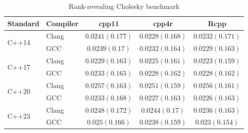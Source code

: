 \begin{table}[H]
\centering
\begingroup\renewcommand{\arraystretch}{1.2}
\begin{tabular}{|l|l|c|c|c|}
\hline
Standard & Compiler & cpp11 & cpp4r & Rcpp \\
\hline
\multirow{2}{*}{C++14} & \multirow{1}{*}{Clang} & $0.0241 (0.177)$ & $0.0228 (0.168)$ & $0.0232 (0.171)$ \\
\cline{2-5}
 & \multirow{1}{*}{GCC} & $0.0239 (0.17)$ & $0.0232 (0.164)$ & $0.0229 (0.163)$ \\
\hline
\multirow{2}{*}{C++17} & \multirow{1}{*}{Clang} & $0.0229 (0.163)$ & $0.0225 (0.161)$ & $0.0223 (0.159)$ \\
\cline{2-5}
 & \multirow{1}{*}{GCC} & $0.0233 (0.165)$ & $0.0228 (0.162)$ & $0.0228 (0.162)$ \\
\hline
\multirow{2}{*}{C++20} & \multirow{1}{*}{Clang} & $0.0257 (0.163)$ & $0.0251 (0.159)$ & $0.0256 (0.161)$ \\
\cline{2-5}
 & \multirow{1}{*}{GCC} & $0.0233 (0.168)$ & $0.0227 (0.163)$ & $0.0226 (0.163)$ \\
\hline
\multirow{2}{*}{C++23} & \multirow{1}{*}{Clang} & $0.0248 (0.172)$ & $0.0244 (0.17)$ & $0.0236 (0.163)$ \\
\cline{2-5}
 & \multirow{1}{*}{GCC} & $0.025 (0.166)$ & $0.0238 (0.159)$ & $0.023 (0.154)$ \\
\hline
\end{tabular}
\caption{Rank-revealing Cholesky benchmark}
\endgroup
\end{table}

